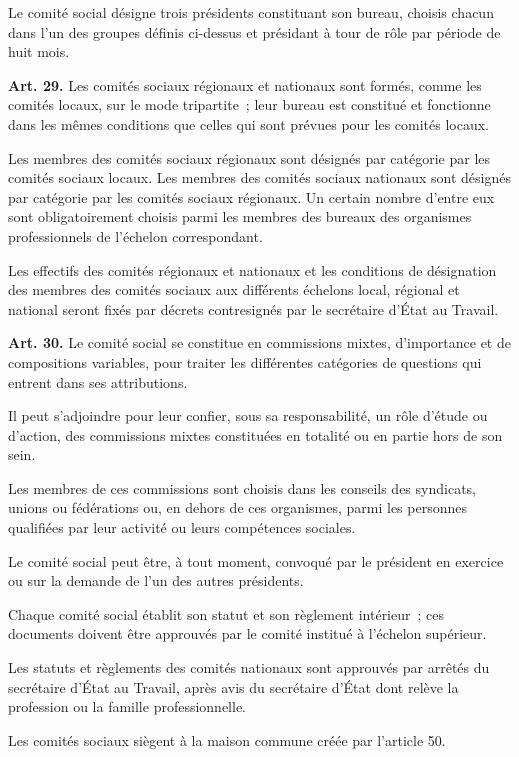 \documentclass[french,twoside]{book} %
\newcommand{\labelchar}[1]{\textbf{\color{rubric} #1}}
\begin{document}
\noindent Le comité social désigne trois présidents constituant son bureau, choisis chacun dans l’un des groupes définis ci-dessus et présidant à tour de rôle par période de huit mois.\par
\bigbreak
\noindent \labelchar{Art. 29.} Les comités sociaux régionaux et nationaux sont formés, comme les comités locaux, sur le mode tripartite ; leur bureau est constitué et fonctionne dans les mêmes conditions que celles qui sont prévues pour les comités locaux.\par
Les membres des comités sociaux régionaux sont désignés par catégorie par les comités sociaux locaux. Les membres des comités sociaux nationaux sont désignés par catégorie par les comités sociaux régionaux. Un certain nombre d’entre eux sont obligatoirement choisis parmi les membres des bureaux des organismes professionnels de l’échelon correspondant.\par
Les effectifs des comités régionaux et nationaux et les conditions de désignation des membres des comités sociaux aux différents échelons local, régional et national seront fixés par décrets contresignés par le secrétaire d’État au Travail.\par
\bigbreak
\noindent \labelchar{Art. 30.} Le comité social se constitue en commissions mixtes, d’importance et de compositions variables, pour traiter les différentes catégories de questions qui entrent dans ses attributions.\par
Il peut s’adjoindre pour leur confier, sous sa responsabilité, un rôle d’étude ou d’action, des commissions mixtes constituées en totalité ou en partie hors de son sein.\par
Les membres de ces commissions sont choisis dans les conseils des syndicats, unions ou fédérations ou, en dehors de ces organismes, parmi les personnes qualifiées par leur activité ou leurs compétences sociales.\par
Le comité social peut être, à tout moment, convoqué par le président en exercice ou sur la demande de l’un des autres présidents.\par
Chaque comité social établit son statut et son règlement intérieur ; ces documents doivent être approuvés par le comité institué à l’échelon supérieur.\par
Les statuts et règlements des comités nationaux sont approuvés par arrêtés du secrétaire d’État au Travail, après avis du secrétaire d’État dont relève la profession ou la famille professionnelle.\par
Les comités sociaux siègent à la maison commune créée par l’article 50.\par
\end{document}
